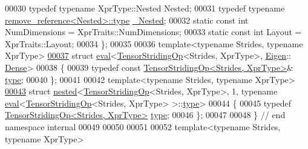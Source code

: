 \begin{DoxyCode}
00030   \textcolor{keyword}{typedef} \textcolor{keyword}{typename} XprType::Nested Nested;
00031   \textcolor{keyword}{typedef} \textcolor{keyword}{typename} \hyperlink{group___sparse_core___module}{remove\_reference<Nested>::type} 
      \hyperlink{group___sparse_core___module}{\_Nested};
00032   \textcolor{keyword}{static} \textcolor{keyword}{const} \textcolor{keywordtype}{int} NumDimensions = XprTraits::NumDimensions;
00033   \textcolor{keyword}{static} \textcolor{keyword}{const} \textcolor{keywordtype}{int} Layout = XprTraits::Layout;
00034 \};
00035 
00036 \textcolor{keyword}{template}<\textcolor{keyword}{typename} Str\textcolor{keywordtype}{id}es, \textcolor{keyword}{typename} XprType>
\hyperlink{struct_eigen_1_1internal_1_1eval_3_01_tensor_striding_op_3_01_strides_00_01_xpr_type_01_4_00_01_eigen_1_1_dense_01_4}{00037} \textcolor{keyword}{struct }\hyperlink{struct_eigen_1_1internal_1_1eval}{eval}<\hyperlink{class_eigen_1_1_tensor_striding_op}{TensorStridingOp}<Strides, XprType>, \hyperlink{namespace_eigen}{Eigen}::
      \hyperlink{struct_eigen_1_1_dense}{Dense}>
00038 \{
00039   \textcolor{keyword}{typedef} \textcolor{keyword}{const} \hyperlink{class_eigen_1_1_tensor_striding_op}{TensorStridingOp<Strides, XprType>}& 
      \hyperlink{class_eigen_1_1_tensor_striding_op}{type};
00040 \};
00041 
00042 \textcolor{keyword}{template}<\textcolor{keyword}{typename} Str\textcolor{keywordtype}{id}es, \textcolor{keyword}{typename} XprType>
\hyperlink{struct_eigen_1_1internal_1_1nested_3_01_tensor_striding_op_3_01_strides_00_01_xpr_type_01_4_00_02d594d957e3c480f253fbd76dacb178f}{00043} \textcolor{keyword}{struct }\hyperlink{struct_eigen_1_1internal_1_1nested}{nested}<\hyperlink{class_eigen_1_1_tensor_striding_op}{TensorStridingOp}<Strides, XprType>, 1, typename 
      \hyperlink{struct_eigen_1_1internal_1_1eval}{eval}<\hyperlink{class_eigen_1_1_tensor_striding_op}{TensorStridingOp}<Strides, XprType> >::\hyperlink{class_eigen_1_1_tensor_striding_op}{type}>
00044 \{
00045   \textcolor{keyword}{typedef} \hyperlink{class_eigen_1_1_tensor_striding_op}{TensorStridingOp<Strides, XprType>} 
      \hyperlink{class_eigen_1_1_tensor_striding_op}{type};
00046 \};
00047 
00048 \}  \textcolor{comment}{// end namespace internal}
00049 
00050 
00051 
00052 \textcolor{keyword}{template}<\textcolor{keyword}{typename} Str\textcolor{keywordtype}{id}es, \textcolor{keyword}{typename} XprType>

\end{DoxyCode}
